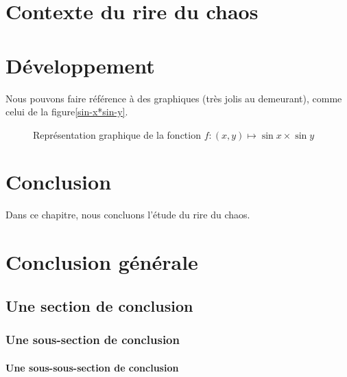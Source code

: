 \documentclass[12pt,space=onehalf,version=final]{yathesis}
\begin{document}
\chapter{Contexte du rire du chaos}

\lipsum[26-32]
\chapter{Développement}

Nous pouvons faire référence à des graphiques (très jolis au demeurant), comme
celui de la figure\vref{sin-x*sin-y}.
\lipsum[3-10]
\begin{figure}[ht]
  \centering
  \capstart
  \caption{Représentation graphique de la fonction $f:(x,y)\mapsto
    \sin x\times\sin y$}
  \label{sin-x*sin-y}
\end{figure}
\chapter{Conclusion}
Dans ce chapitre, nous concluons l'étude du rire du chaos.

\lipsum[6-9]
%
\chapter*{Conclusion générale}
\lipsum[26-27]
\section{Une section de conclusion}
\lipsum[28-29]
\subsection{Une sous-section de conclusion}
\lipsum[29-31]
\subsubsection{Une sous-sous-section de conclusion}
\lipsum[31-35]
\end{document}
